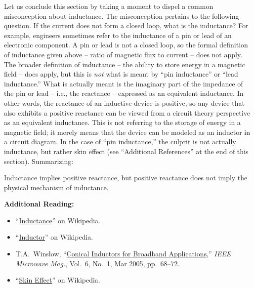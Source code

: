 Let us conclude this section by taking a moment to dispel a common misconception about inductance.  
The misconception pertains to the following question.  If the current does not form a closed loop, what is the inductance?
For example, engineers sometimes refer to the inductance of a pin or lead of an electronic component.
A pin or lead is not a closed loop, so the formal definition of inductance given above -- ratio of magnetic flux to current -- does not apply.
The broader definition of inductance -- the ability to store energy in a magnetic field -- does apply, but this is \emph{not} what is meant by ``pin inductance'' or ``lead inductance.''  
What is actually meant is the imaginary part of the impedance of the pin or lead -- i.e., the reactance -- expressed as an equivalent inductance.
In other words, the reactance of an inductive device is positive, so any device that also exhibits a positive reactance can be viewed from a circuit theory perspective as an equivalent inductance.  
This is not referring to the storage of energy in a magnetic field; it merely means that the device can be modeled as an inductor in a circuit diagram.
In the case of ``pin inductance,'' the culprit is not actually inductance, but rather skin effect 
(see ``Additional References'' at the end of this section).
Summarizing: 
%
\begin{mdframed}[backgroundcolor=yellow!20,nobreak=true] 
Inductance implies positive reactance, but positive reactance 
does not imply the physical mechanism of inductance. 
\end{mdframed}

 
{\bf Additional Reading:}
\begin{itemize}
\item ``\href{https://en.wikipedia.org/wiki/Inductance}{Inductance}'' on Wikipedia.
\item ``\href{https://en.wikipedia.org/wiki/Inductor}{Inductor}'' on Wikipedia.
\item T.A.\ Winslow, ``\href{https://doi.org/10.1109/MMW.2005.1418000}{Conical Inductors for Broadband Applications},'' \emph{IEEE Microwave Mag.}, Vol.~6, No.~1, Mar 2005, pp.~68--72.
\item ``\href{https://en.wikipedia.org/wiki/Skin_effect}{Skin Effect}'' on Wikipedia.
\end{itemize}

